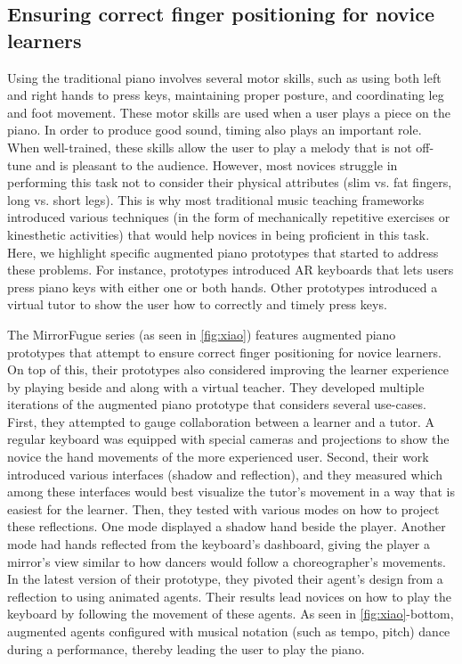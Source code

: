 \documentclass[sigconf, screen, review]{acmart}
\let\xtodo\todo
\renewcommand{\todo}[1]{\xtodo[inline]{#1}}
\newcommand{\todoj}[1]{\xtodo[inline,color=orange!50]{Jordan: #1}}
\begin{document}
\subsection{Ensuring correct finger positioning for novice learners}
Using the traditional piano involves several motor skills, such as using both left and right hands to press keys, maintaining proper posture, and coordinating leg and foot movement. These motor skills are used when a user plays a piece on the piano. In order to produce good sound, timing also plays an important role. When well-trained, these skills allow the user to play a melody that is not off-tune and is pleasant to the audience. However, most novices struggle in performing this task not to consider their physical attributes (slim vs. fat fingers, long vs. short legs). This is why most traditional music teaching frameworks introduced various techniques (in the form of mechanically repetitive exercises or kinesthetic activities) that would help novices in being proficient in this task. Here, we highlight specific augmented piano prototypes that started to address these problems. For instance, prototypes introduced AR keyboards that lets users press piano keys with either one or both hands. Other prototypes introduced a virtual tutor to show the user how to correctly and timely press keys. 
\todoj{sketch mirrorfugue series by xiao - Cuau help!  }

The MirrorFugue series \cite{xiao2010mirrorfugue, xiao2011duet, xiao2013mirrorfugue, xiao2014andante} (as seen in \autoref{fig:xiao}) features augmented piano prototypes that attempt to ensure correct finger positioning for novice learners.  On top of this, their prototypes also considered improving the learner experience by playing beside and along with a virtual teacher. They developed multiple iterations of the augmented piano prototype that considers several use-cases. First, they attempted to gauge collaboration between a learner and a tutor. A regular keyboard was equipped with special cameras and projections to show the novice the hand movements of the more experienced user. Second, their work introduced various interfaces (shadow and reflection), and they measured which among these interfaces would best visualize the tutor's movement in a way that is easiest for the learner. Then, they tested with various modes on how to project these reflections. One mode displayed a shadow hand beside the player. Another mode had hands reflected from the keyboard's dashboard, giving the player a mirror's view similar to how dancers would follow a choreographer's movements. In the latest version of their prototype, they pivoted their agent's design from a reflection to using animated agents. Their results lead novices on how to play the keyboard by following the movement of these agents. As seen in \autoref{fig:xiao}-bottom, augmented agents configured with musical notation (such as tempo, pitch) dance during a performance, thereby leading the user to play the piano. 
\end{document}
